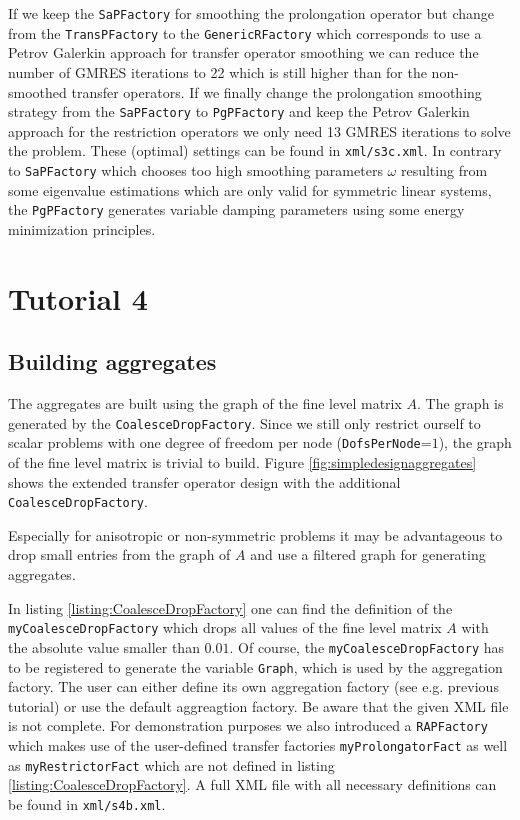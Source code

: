 \documentclass[12pt,a4paper]{article}
\begin{document}
If we keep the \verb|SaPFactory| for smoothing the prolongation operator but change from the \verb|TransPFactory| to the \verb|GenericRFactory| which corresponds to use a Petrov Galerkin approach for transfer operator smoothing we can reduce the number of GMRES iterations to 22 which is still higher than for the non-smoothed transfer operators. If we finally change the prolongation smoothing strategy from the \verb|SaPFactory| to \verb|PgPFactory| and keep the Petrov Galerkin approach for the restriction operators we only need 13 GMRES iterations to solve the problem. These (optimal) settings can be found in \verb|xml/s3c.xml|. In contrary to \verb|SaPFactory| which chooses too high smoothing parameters $\omega$ resulting from some eigenvalue estimations which are only valid for symmetric linear systems, the \verb|PgPFactory| generates variable damping parameters using some energy minimization principles.

\section{Tutorial 4}

\subsection{Building aggregates}

The aggregates are built using the graph of the fine level matrix $A$. The graph is generated by the \verb|CoalesceDropFactory|. Since we still only restrict ourself to scalar problems with one degree of freedom per node (\verb|DofsPerNode|=$1$), the graph of the fine level matrix is trivial to build.
Figure \ref{fig:simpledesignaggregates} shows the extended transfer operator design with the additional \verb|CoalesceDropFactory|.

Especially for anisotropic or non-symmetric problems it may be advantageous to drop small entries from the graph of $A$ and use a filtered graph for generating aggregates.

In listing \ref{listing:CoalesceDropFactory} one can find the definition of the \verb|myCoalesceDropFactory| which drops all values of the fine level matrix $A$ with the absolute value smaller than $0.01$. Of course, the \verb|myCoalesceDropFactory| has to be registered to generate the variable \verb|Graph|, which is used by the aggregation factory. The user can either define its own aggregation factory (see e.g. previous tutorial) or use the default aggreagtion factory. Be aware that the given XML file is not complete. For demonstration purposes we also introduced a \verb|RAPFactory| which makes use of the user-defined transfer factories \verb|myProlongatorFact| as well as \verb|myRestrictorFact| which are not defined in listing \ref{listing:CoalesceDropFactory}. A full XML file with all necessary definitions can be found in \verb|xml/s4b.xml|.
\end{document}
